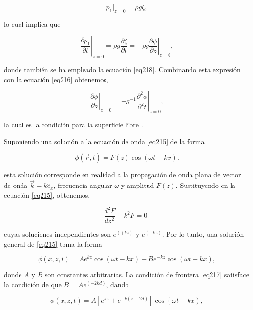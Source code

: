 \begin{equation}\label{eq219}
   p_1|_{z=0} = \rho g\zeta,
\end{equation}

\noindent lo cual implica que

\begin{equation}\label{eq220}
   \left. \frac{\partial p_1}{\partial t} \right|_{z=0} = \rho g \frac{\partial \zeta}{\partial t} = - \left. \rho g \frac{\partial \phi}{\partial z} \right|_{z=0}, 
\end{equation}

\noindent donde también se ha empleado la ecuación \ref{eq218}. Combinando esta expresión con la ecuación \ref{eq216} obtenemos,

\begin{equation}\label{eq221}
   \left. \frac{\partial \phi}{\partial z} \right|_{z=0} = - g^{-1} \left. \frac{\partial^2 \phi}{\partial^2 t} \right|_{z=0},
\end{equation}

\noindent la cual es la condición para la superficie libre \cite{Lamb1975}.

Suponiendo una solución a la ecuación de onda \ref{eq215} de la forma

\begin{equation}\label{eq222}
  \phi(\vec{r}, t) = F(z) \cos(\omega t - k x).
\end{equation}

\noindent esta solución corresponde en realidad a la propagación de onda plana de vector de onda $\vec{k} = k \hat{e}_x$, frecuencia angular $\omega$ y amplitud $F(z)$. Sustituyendo en la ecuación \ref{eq215}, obtenemos, 

\begin{equation}\label{eq223}
  \frac{d^2 F}{d z^2} - k^2 F = 0,
\end{equation}

\noindent cuyas soluciones independientes son $e^{(+k z)}$ y $e^{(-k z)}$. Por lo tanto, una solución general de \ref{eq215} toma la forma

\begin{equation}\label{eq224}
   \phi(x, z, t) = A e^{k z}\cos(\omega t - k x) + B e^{-k z}\cos(\omega t - k x),
\end{equation}

\noindent donde $A$ y $B$ son constantes arbitrarias. La condición de frontera \ref{eq217} satisface la condición de que $B = A e^{(-2kd)}$, dando

\begin{equation}\label{eq225}
   \phi(x, z, t) = A \left[e^{k z}+e^{-k(z+2d)}\right] \cos(\omega t - k x),
\end{equation}

